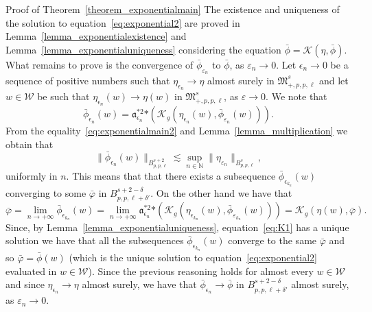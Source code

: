 \documentclass[a4paper,10pt]{article}
\newcommand{\asterisk}{\mathord{*}}
\newenvironment{proof*}[1]{\noindent\textbf{#1\ }}{\hspace*{\fill}$\Box$\medskip}
\begin{document}
\begin{proof*}{Proof of Theorem~\ref{theorem_exponentialmain}}
  The existence and uniqueness of the solution to
  equation~{\eqref{eq:exponential2}} are proved in
  Lemma~\ref{lemma_exponentialexistence} and
  Lemma~\ref{lemma_exponentialuniqueness} considering the equation $\bar{\phi}
  = \mathcal{K} (\eta, \bar{\phi})$. What remains to prove is the convergence
  of $\bar{\phi}_{\varepsilon_n}$ to $\bar{\phi}$, as $\varepsilon_n
  \rightarrow 0$. Let $\epsilon_n \rightarrow 0$ be a sequence of positive
  numbers such that $\eta_{\epsilon_n} \rightarrow \eta$ almost surely in
  $\mathfrak{M}^s_{+, p, p, \ell}$ and let $w \in \mathcal{W}$ be such that
  $\eta_{\epsilon_n} (w) \rightarrow \eta (w)$ in $\mathfrak{M}^s_{+, p, p,
  \ell}$, as $\varepsilon \rightarrow 0$. We note that
  \begin{equation}
    \bar{\phi}_{\epsilon_n} (w) = \mathfrak{a}^{\asterisk 2}_{\epsilon_n}
    \asterisk (\mathcal{K}_g (\eta_{\epsilon_n} (w),
    \bar{\phi}_{\varepsilon_n} (w))) . \label{eq:exponentialmain2}
  \end{equation}
  From the equality~{\eqref{eq:exponentialmain2}} and
  Lemma~\ref{lemma_multiplication} we obtain that
  \[ \| \bar{\phi}_{\epsilon_n} (w) \|_{B^{s + 2}_{p, p, \ell}} \lesssim
     \sup_{n \in \mathbb{N}} \| \eta_{\varepsilon_n} \|_{B^s_{p, p, \ell}}, \]
  uniformly in $n$. This means that that there exists a subsequence
  $\bar{\phi}_{\epsilon_{k_n}} (w)$ converging to some $\bar{\varphi}$ in
  $B^{s + 2 - \delta}_{p, p, \ell + \delta'}$. On the other hand we have that
  \[ \bar{\varphi} = \lim_{n \rightarrow + \infty}
     \bar{\phi}_{\epsilon_{k_n}} (w) = \lim_{n \rightarrow + \infty}
     \mathfrak{a}^{\asterisk 2}_{\epsilon_n} \asterisk \left( \mathcal{K}_g
     \left( \eta_{\epsilon_{k_n}} (w), \bar{\phi}_{\varepsilon_{k_n}} (w)
     \right) \right) = \mathcal{K}_g (\eta (w), \bar{\varphi}) . \]
  Since, by Lemma~\ref{lemma_exponentialuniqueness}, equation~{\eqref{eq:K1}}
  has a unique solution we have that all the subsequences
  $\bar{\phi}_{\epsilon_{k_n}} (w)$ converge to the same $\bar{\varphi}$ and
  so $\bar{\varphi} = \bar{\phi} (w)$ (which is the unique solution to
  equation~{\eqref{eq:exponential2}} evaluated in $w \in \mathcal{W}$). Since
  the previous reasoning holds for almost every $w \in \mathcal{W}$ and since
  $\eta_{\epsilon_n} \rightarrow \eta$ almost surely, we have that
  $\bar{\phi}_{\epsilon_n} \rightarrow \bar{\phi}$ in $B^{s + 2 - \delta}_{p,
  p, \ell + \delta'}$ almost surely, as $\varepsilon_n \rightarrow 0$.
\end{proof*}
\end{document}

